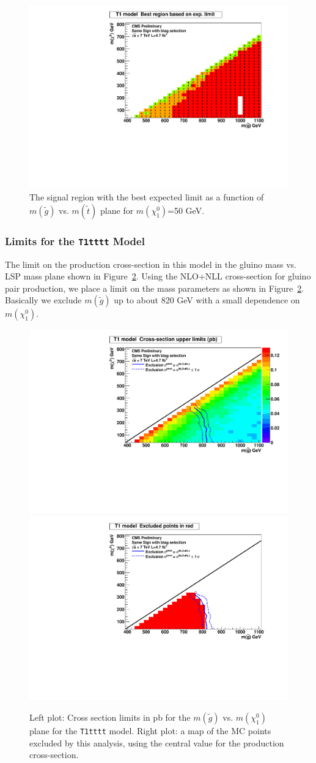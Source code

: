 \begin{figure}[htb]
\begin{center}
\includegraphics[width=0.4\linewidth]{figs/T1tttt_BestSignalRegion.pdf}
\caption{The signal region with the best expected limit as a function of 
$m(\widetilde{g})$ vs. $m(\widetilde{t})$ plane for $m(\chi^0_1)$=50 GeV.
\label{fig:t1tttoptimize}}
\end{center}
\end{figure}


\subsubsection{Limits for the {\tt T1tttt} Model}
\label{sec:t1ttttlimits}
The limit on the production cross-section in this model in the 
gluino mass vs. LSP mass plane shown in Figure~\ref{fig:T1ttttLimit}.  
Using the 
NLO$+$NLL cross-section for gluino pair production, we place a limit
on the mass parameters as shown in Figure~\ref{fig:T1ttttLimit}.
Basically we exclude 
$m(\widetilde{g})$ up to about 820 GeV with a small dependence on 
$m(\chi_1^0)$.

\begin{figure}[htb]
\begin{center}
\includegraphics[width=0.48\linewidth]{figs/T1tttt_LimitsOnCarpet.pdf}
\includegraphics[width=0.48\linewidth]{figs/T1tttt_ExcludedRegionMap.pdf}
\caption{
Left plot: Cross section limits in pb for the $m(\widetilde{g})$ vs. 
$m(\chi_1^0)$ plane for the
{\tt T1tttt} model.  Right plot: a map of the MC points excluded by this
analysis, using the central value for the production cross-section.
\label{fig:T1ttttLimit}}
\end{center}
\end{figure}

